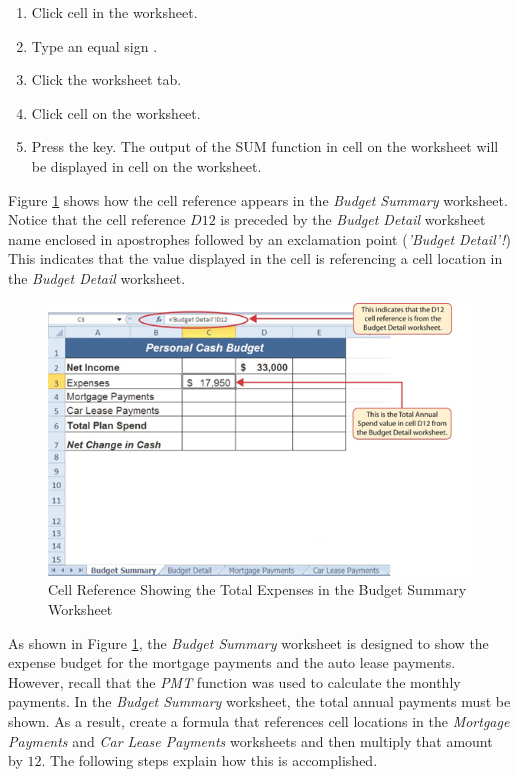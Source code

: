 \begin{enumbox}
	\begin{enumerate}
		\item Click cell  in the  worksheet.
		\item Type an equal sign \fmtTyping{=}.
		\item Click the  worksheet tab.
		\item Click cell  on the  worksheet.
		\item Press the  key. The output of the SUM function in cell  on the  worksheet will be displayed in cell  on the  worksheet.
	\end{enumerate}
\end{enumbox}

Figure \ref{02:fig36} shows how the cell reference appears in the \textit{Budget Summary} worksheet. Notice that the cell reference $ D12 $ is preceded by the \textit{Budget Detail} worksheet name enclosed in apostrophes followed by an exclamation point (\textit{'Budget Detail'!}) This indicates that the value displayed in the cell is referencing a cell location in the \textit{Budget Detail} worksheet.

\begin{figure}[H]
	\centering
	\includegraphics[width=\maxwidth{.95\linewidth}]{gfx/ch02_fig36}
	\caption{Cell Reference Showing the Total Expenses in the Budget Summary Worksheet}
	\label{02:fig36}
\end{figure}

As shown in Figure \ref{02:fig36}, the \textit{Budget Summary} worksheet is designed to show the expense budget for the mortgage payments and the auto lease payments. However, recall that the \textit{PMT} function was used to calculate the monthly payments. In the \textit{Budget Summary} worksheet, the total annual payments must be shown. As a result, create a formula that references cell locations in the \textit{Mortgage Payments} and \textit{Car Lease Payments} worksheets and then multiply that amount by $ 12 $. The following steps explain how this is accomplished.

